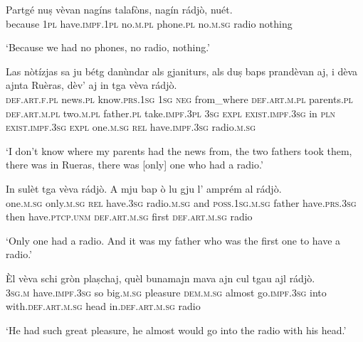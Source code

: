 \begin{linenumbers}
\gll    Partgé nuṣ vèvan nagíns talafòns, nagín rádjò, nuét.\\
because \textsc{1pl} have.\textsc{impf.1pl} no.\textsc{m.pl} phone.\textsc{pl} no.\textsc{m.sg} radio nothing\\
\end{linenumbers}
\medskip
\glt `Because we had no phones, no radio, nothing.'
\medskip

\begin{linenumbers}
\gll    Las nòtízjas sa ju bétg danùndar als gjaniturs, als duṣ baps prandèvan aj, i dèva ajnta Ruèras, dèv’ aj in tga vèva rádjò. \\
\textsc{def.art.f.pl} news.\textsc{pl} know.\textsc{prs.1sg} \textsc{1sg} \textsc{neg} from\_where \textsc{def.art.m.pl} parents.\textsc{pl} \textsc{def.art.m.pl} two.\textsc{m.pl} father.\textsc{pl} take.\textsc{impf.3pl} \textsc{3sg} \textsc{expl} \textsc{exist.impf.3sg} in \textsc{pln} \textsc{exist.impf.3sg} \textsc{expl}  one.\textsc{m.sg} \textsc{rel} have.\textsc{impf.3sg} radio.\textsc{m.sg}\\
\end{linenumbers}
\medskip
\glt `I don’t know where my parents had the news from, the two fathers took them, there was in Rueras, there was [only] one who had a radio.'
\medskip

\begin{linenumbers}
\gll    In sulèt tga vèva rádjò. A mju bap ò lu gju l’ amprém al rádjò.\\
one.\textsc{m.sg} only.\textsc{m.sg} \textsc{rel} have.\textsc{3sg} radio.\textsc{m.sg} and \textsc{poss.1sg.m.sg} father have.\textsc{prs.3sg} then have.\textsc{ptcp.unm} \textsc{def.art.m.sg} first \textsc{def.art.m.sg} radio\\
\end{linenumbers}
\medskip
\glt `Only one had a radio. And it was my father who was the first one to have a radio.'
\medskip

\begin{linenumbers}
\gll    Èl vèva schi gròn plaṣchaj, quèl bunamajn mava ajn cul tgau ajl rádjò.\\
 \textsc{3sg.m} have.\textsc{impf.3sg} so big.\textsc{m.sg} pleasure \textsc{dem.m.sg} almost go.\textsc{impf.3sg} into with.\textsc{def.art.m.sg} head in.\textsc{def.art.m.sg} radio\\
\end{linenumbers}
\medskip
\glt `He had such great pleasure, he almost would go into the radio with his head.'
\medskip

